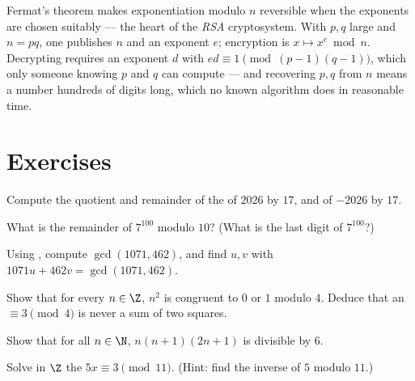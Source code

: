 \begin{example}\label{ex:g12:arith:rsa}
Fermat's theorem makes exponentiation modulo $n$ reversible when the
exponents are chosen suitably --- the heart of the \emph{RSA} cryptosystem.
With $p, q$ large  and $n = pq$, one publishes $n$ and an exponent
$e$; encryption is $x \mapsto x^e \bmod n$. Decrypting requires an exponent
$d$ with $ed \equiv 1 \pmod{(p-1)(q-1)}$, which only someone knowing $p$
and $q$ can compute --- and recovering $p, q$ from $n$ means  a
number hundreds of digits long, which no known algorithm does in reasonable
time.
\end{example}

\section{Exercises}

\begin{exercise}[$\star$]\label{exo:g12:arith:1}
Compute the quotient and remainder of the  of $2026$ by
$17$, and of $-2026$ by $17$.
\end{exercise}

\begin{exercise}[$\star$]\label{exo:g12:arith:2}
What is the remainder of $7^{100}$ modulo $10$? (What is the last digit of
$7^{100}$?)
\end{exercise}

\begin{exercise}[$\star$]\label{exo:g12:arith:3}
Using , compute $\gcd(1071, 462)$, and find 
$u, v$ with $1071u + 462v = \gcd(1071, 462)$.
\end{exercise}

\begin{exercise}[$\star$]\label{exo:g12:arith:4}
Show that for every $n \in \Z$, $n^2$ is congruent to $0$ or $1$ modulo
$4$. Deduce that an  $\equiv 3 \pmod 4$ is never a sum of two
squares.
\end{exercise}

\begin{exercise}[$\star\star$]\label{exo:g12:arith:5}
Show that for all $n \in \N$, $n(n+1)(2n+1)$ is divisible by $6$.
\end{exercise}

\begin{exercise}[$\star\star$]\label{exo:g12:arith:6}
Solve in $\Z$ the  $5x \equiv 3 \pmod{11}$.
(Hint: find the inverse of $5$ modulo $11$.)
\end{exercise}

